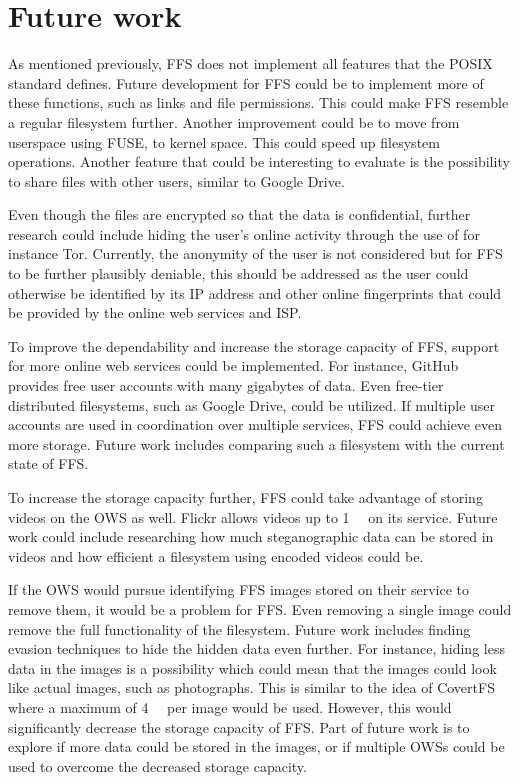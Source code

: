
\section{Future work}
\label{sec:futureWork}
As mentioned previously, \gls{FFS} does not implement all features that the POSIX standard defines. Future development for \gls{FFS} could be to implement more of these functions, such as links and file permissions. This could make \gls{FFS} resemble a regular filesystem further. Another improvement could be to move from userspace using \gls{FUSE}, to kernel space. This could speed up filesystem operations. Another feature that could be interesting to evaluate is the possibility to share files with other users, similar to Google Drive.

Even though the files are encrypted so that the data is confidential, further research could include hiding the user's online activity through the use of for instance Tor. Currently, the anonymity of the user is not considered but for \gls{FFS} to be further plausibly deniable, this should be addressed as the user could otherwise be identified by its IP address and other online fingerprints that could be provided by the online web services and \gls{ISP}.

To improve the dependability and increase the storage capacity of \gls{FFS}, support for more online web services could be implemented. For instance, GitHub provides free user accounts with many gigabytes of data. Even \mbox{free-tier} distributed filesystems, such as Google Drive, could be utilized. If multiple user accounts are used in coordination over multiple services, \gls{FFS} could achieve even more storage. Future work includes comparing such a filesystem with the current state of \gls{FFS}.

To increase the storage capacity further, \gls{FFS} could take advantage of storing videos on the \gls{OWS} as well. Flickr allows videos up to \SI[per-mode = symbol]{1}{\giga\byte} on its service. Future work could include researching how much steganographic data can be stored in videos and how efficient a filesystem using encoded videos could be.

If the \gls{OWS} would pursue identifying \gls{FFS} images stored on their service to remove them, it would be a problem for \gls{FFS}. Even removing a single image could remove the full functionality of the filesystem. Future work includes finding evasion techniques to hide the hidden data even further. For instance, hiding less data in the images is a possibility which could mean that the images could look like actual images, such as photographs. This is similar to the idea of CovertFS\,\cite{baliga2007web} where a maximum of \SI[per-mode = symbol]{4}{\kilo\byte} per image would be used. However, this would significantly decrease the storage capacity of \gls{FFS}. Part of future work is to explore if more data could be stored in the images, or if multiple \gls{OWS}s could be used to overcome the decreased storage capacity. 

